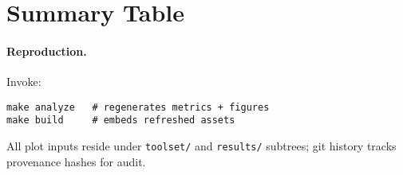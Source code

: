 \section*{Summary Table}

\paragraph{Reproduction.} Invoke:
\begin{verbatim}
make analyze   # regenerates metrics + figures
make build     # embeds refreshed assets
\end{verbatim}

All plot inputs reside under \texttt{toolset/} and \texttt{results/} subtrees; git
history tracks provenance hashes for audit.
